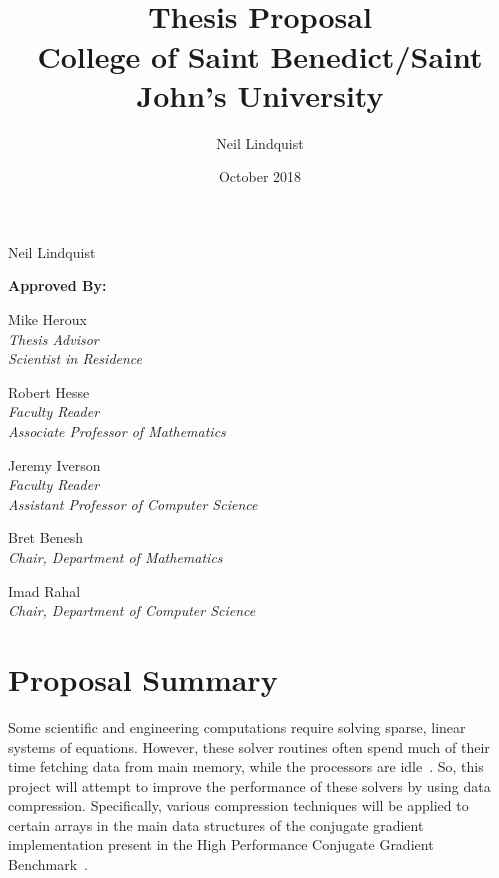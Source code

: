 \documentclass[titlepage]{article}
\begin{document}
\title{
	 \\
	\bigskip
	\Large Thesis Proposal\\
	\bigskip
	College of Saint Benedict/Saint John's University}
\author{Neil Lindquist}
\date{October 2018}

\maketitle

\begin{center}
	{\Large }
	
	Neil Lindquist 
	
	\bigskip
	\bigskip
	
	\textbf{Approved By:}
	
	\bigskip
	
	Mike Heroux\\
	\textit{Thesis Advisor}\\
	\textit{Scientist in Residence}

	\bigskip

	Robert Hesse\\
	\textit{Faculty Reader}\\
	\textit{Associate Professor of Mathematics}

	\bigskip

	Jeremy Iverson\\
	\textit{Faculty Reader}\\
	\textit{Assistant Professor of Computer Science}
	
	\bigskip

	Bret Benesh\\
	\textit{Chair, Department of Mathematics}
	
	\bigskip
	
	Imad Rahal\\
	\textit{Chair, Department of Computer Science}
\end{center}

\clearpage


\section{Proposal Summary}
Some scientific and engineering computations require solving sparse, linear systems of equations.
However, these solver routines often spend much of their time fetching data from main memory, while the processors are idle~\cite{Goumas:2009:performanceEval}.
So, this project will attempt to improve the performance of these solvers by using data compression.
Specifically, various compression techniques will be applied to certain arrays in the main data structures of the conjugate gradient implementation present in the High Performance Conjugate Gradient Benchmark~\cite{Dongarra:2015:HPCG}.
\end{document}
